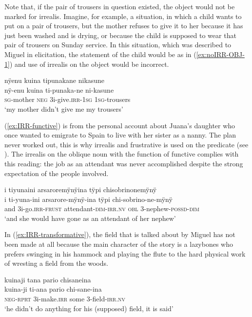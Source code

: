 Note that, if the pair of trousers in question existed, the object would not be marked for irrealis. Imagine, for example, a situation, in which a child wants to put on a pair of trousers, but the mother refuses to give it to her because it has just been washed and is drying, or because the child is supposed to wear that pair of trousers on Sunday service. In this situation, which was described to Miguel in elicitation, the statement of the child would be as in (\ref{ex:noIRR-OBJ-1}) and use of irrealis on the object would be incorrect.

\ea\label{ex:noIRR-OBJ-1}
\begingl 
\glpreamble nÿenu kuina tipunakane nikasune\\
\gla nÿ-enu kuina ti-punaka-ne ni-kasune\\ 
\textsc{sg}-mother \textsc{neg} 3i-give.\textsc{irr}-1\textsc{sg} 1\textsc{sg}-trousers\\ 
\glft ‘my mother didn't give me my trousers’\\ 
\endgl
\trailingcitation{[mxx-e160811sd.039]}
\xe

(\ref{ex:IRR-functive}) is from the personal account about Juana’s daughter who once wanted to emigrate to Spain to live with her sister as a nanny. The plan never worked out, this is why irrealis and frustrative is used on the predicate (see ). The irrealis on the oblique noun with the function of functive \citep[cf.][]{Creissels2014} complies with this reading: the job as an attendant was never accomplished despite the strong expectation of the people involved.

\ea\label{ex:IRR-functive}
\begingl 
\glpreamble i tiyunaini arsaroremÿnÿina tÿpi chisobrinonemÿnÿ\\
\gla i ti-yuna-ini arsarore-mÿnÿ-ina tÿpi chi-sobrino-ne-mÿnÿ\\ 
\glb and 3i-go.\textsc{irr}-\textsc{frust} attendant-\textsc{dim}-\textsc{irr.nv} \textsc{obl} 3-nephew-\textsc{possd}-\textsc{dim}\\ 
\glft ‘and she would have gone as an attendant of her nephew’\\ 
\endgl
\trailingcitation{[jxx-p120430l-1.188]}
\xe

In (\ref{ex:IRR-transformative}), the field that is talked about by Miguel has not been made at all because the main character of the story is a lazybones who prefers swinging in his hammock and playing the flute to the hard physical work of wresting a field from the woods.

\ea\label{ex:IRR-transformative}
\begingl 
\glpreamble kuinaji tana pario chisaneina\\
\gla kuina-ji ti-ana pario chi-sane-ina\\ 
\glb \textsc{neg}-\textsc{rprt} 3i-make.\textsc{irr} some 3-field-\textsc{irr.nv}\\ 
\glft ‘he didn't do anything for his (supposed) field, it is said’\\ 
\endgl
\trailingcitation{[mox-n110920l.012]}
\xe

